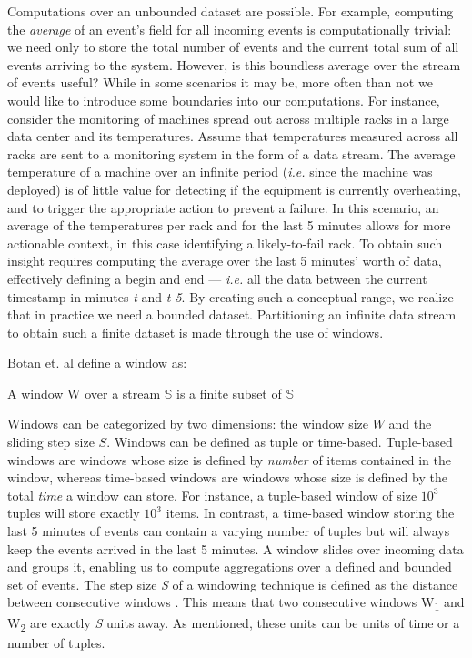 Computations over an unbounded dataset are possible. For example, computing the \textit{average} of an event's field for all incoming events is computationally trivial: we need only to store the total number of events and the current total sum of all events arriving to the system. However, is this boundless average over the stream of events useful? While in some scenarios it may be, more often than not we would like to introduce some boundaries into our computations. For instance, consider the monitoring of machines spread out across multiple racks in a large data center and its temperatures. Assume that temperatures measured across all racks are sent to a monitoring system in the form of a data stream. The average temperature of a machine over an infinite period (\textit{i.e.} since the machine was deployed) is of little value for detecting if the equipment is currently overheating, and to trigger the appropriate action to prevent a failure. In this scenario, an average of the temperatures per rack and for the last 5 minutes allows for more actionable context, in this case identifying a likely-to-fail rack. To obtain such insight requires computing the average over the last 5 minutes' worth of data, effectively defining a begin and end --- \textit{i.e.} all the data between the current timestamp in minutes \textit{t} and \textit{t-5}. By creating such a conceptual range, we realize that in practice we need a bounded dataset. Partitioning an infinite data stream to obtain such a finite dataset is made through the use of windows.

Botan et. al \cite{Botan-SECRET} define a window as:
\begin{definition}
A window W over a stream $\mathbb{S}$ is a finite subset of $\mathbb{S}$
\end{definition}
Windows can be categorized by two dimensions: the window size $W$ and the sliding step size $S$. Windows can be defined as tuple or time-based. Tuple-based windows are windows whose size is defined by \emph{number} of items contained in the window, whereas time-based windows are windows whose size is defined by the total \emph{time} a window can store. For instance, a tuple-based window of size $10^3$ tuples will store exactly $10^3$ items. In contrast, a time-based window storing the last 5 minutes of events can contain a varying number of tuples but will always keep the events arrived in the last 5 minutes. A window slides over incoming data and groups it, enabling us to compute aggregations over a defined and bounded set of events. The step size \textit{S} of a windowing technique is defined as the distance between consecutive windows \cite{Botan-SECRET}. This means that two consecutive windows W\textsubscript{1} and W\textsubscript{2} are exactly \textit{S} units away. As mentioned, these units can be units of time or a number of tuples.

